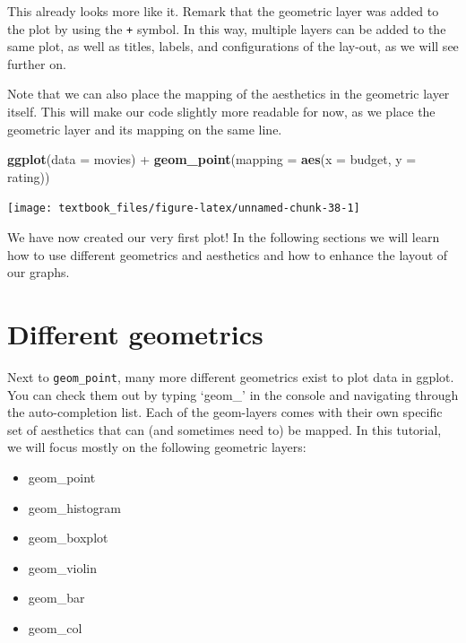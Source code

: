 \documentclass[]{tufte-book}
\newenvironment{Shaded}{}{}
\newcommand{\DataTypeTok}[1]{\textcolor[rgb]{0.56,0.13,0.00}{#1}}
\newcommand{\KeywordTok}[1]{\textcolor[rgb]{0.00,0.44,0.13}{\textbf{#1}}}
\newcommand{\NormalTok}[1]{#1}
\newcommand{\OperatorTok}[1]{\textcolor[rgb]{0.40,0.40,0.40}{#1}}
\newcommand{\StringTok}[1]{\textcolor[rgb]{0.25,0.44,0.63}{#1}}
\providecommand{\tightlist}{%
  \setlength{\itemsep}{0pt}\setlength{\parskip}{0pt}}
\begin{document}
This already looks more like it. Remark that the geometric layer was added to the plot by using the \texttt{+} symbol. In this way, multiple layers can be added to the same plot, as well as titles, labels, and configurations of the lay-out, as we will see further on.

Note that we can also place the mapping of the aesthetics in the geometric layer itself. This will make our code slightly more readable for now, as we place the geometric layer and its mapping on the same line.

\begin{Shaded}
\begin{Highlighting}[]
\KeywordTok{ggplot}\NormalTok{(}\DataTypeTok{data =}\NormalTok{ movies) }\OperatorTok{+}
\StringTok{    }\KeywordTok{geom_point}\NormalTok{(}\DataTypeTok{mapping =} \KeywordTok{aes}\NormalTok{(}\DataTypeTok{x =}\NormalTok{ budget, }\DataTypeTok{y =}\NormalTok{ rating))}
\end{Highlighting}
\end{Shaded}

\texttt{[image: textbook\_files/figure-latex/unnamed-chunk-38-1]}

We have now created our very first plot! In the following sections we will learn how to use different geometrics and aesthetics and how to enhance the layout of our graphs.

\hypertarget{different-geometrics}{%
\section{Different geometrics}\label{different-geometrics}}

Next to \texttt{geom\_point}, many more different geometrics exist to plot data in ggplot. You can check them out by typing `geom\_' in the console and navigating through the auto-completion list. Each of the geom-layers comes with their own specific set of aesthetics that can (and sometimes need to) be mapped. In this tutorial, we will focus mostly on the following geometric layers:

\begin{itemize}
\tightlist
\item
  geom\_point
\item
  geom\_histogram
\item
  geom\_boxplot
\item
  geom\_violin
\item
  geom\_bar
\item
  geom\_col
\end{itemize}
\end{document}
